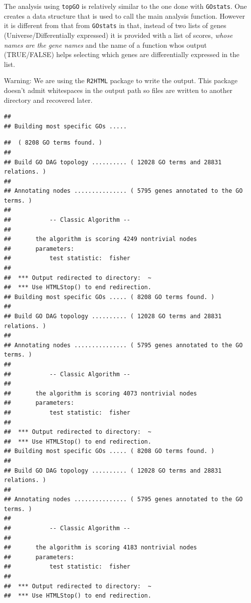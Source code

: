 \documentclass{article}\usepackage[]{graphicx}\usepackage[]{color}
\makeatletter
\newenvironment{kframe}{%
 \def\at@end@of@kframe{}%
 \ifinner\ifhmode%
  \def\at@end@of@kframe{\end{minipage}}%
  \begin{minipage}{\columnwidth}%
 \fi\fi%
 \def\FrameCommand##1{\hskip\@totalleftmargin \hskip-\fboxsep
 \colorbox{shadecolor}{##1}\hskip-\fboxsep
     \hskip-\linewidth \hskip-\@totalleftmargin \hskip\columnwidth}%
 \MakeFramed {\advance\hsize-\width
   \@totalleftmargin\z@ \linewidth\hsize
   \@setminipage}}%
 {\par\unskip\endMakeFramed%
 \at@end@of@kframe}
\newenvironment{knitrout}{}{} %
\makeatother
\begin{document}
The analysis using \texttt{topGO} is relatively similar to the one done with \texttt{GOstats}. One creates a data structure that is used to call the main analysis function. However it is different from that from \texttt{GOstats} in that, instead of two lists of genes (Universe/Differentially expressed) it is provided with a list of scores, \emph{whose names are the gene names} and the name of a function whos output (TRUE/FALSE) helps selecting which genes are differentially expressed in the list.

Warning: We are using the \texttt{R2HTML} package to write the output. This package doesn't admit whitespaces in the output path so files are written to another directory and recovered later.

\begin{knitrout}
\color{fgcolor}\begin{kframe}


{\ttfamily\noindent\itshape\color{messagecolor}{\#\# Loading required package: R2HTML}}\begin{verbatim}
## 
## Building most specific GOs .....
\end{verbatim}


{\ttfamily\noindent\itshape\color{messagecolor}{\#\# Loading required package: hgu133a.db}}

{\ttfamily\noindent\itshape\color{messagecolor}{\#\# }}\begin{verbatim}
## 	( 8208 GO terms found. )
## 
## Build GO DAG topology ..........	( 12028 GO terms and 28831 relations. )
## 
## Annotating nodes ...............	( 5795 genes annotated to the GO terms. )
## 
## 			 -- Classic Algorithm -- 
## 
## 		 the algorithm is scoring 4249 nontrivial nodes
## 		 parameters: 
## 			 test statistic:  fisher 
## 
##  *** Output redirected to directory:  ~
##  *** Use HTMLStop() to end redirection.
## Building most specific GOs .....	( 8208 GO terms found. )
## 
## Build GO DAG topology ..........	( 12028 GO terms and 28831 relations. )
## 
## Annotating nodes ...............	( 5795 genes annotated to the GO terms. )
## 
## 			 -- Classic Algorithm -- 
## 
## 		 the algorithm is scoring 4073 nontrivial nodes
## 		 parameters: 
## 			 test statistic:  fisher 
## 
##  *** Output redirected to directory:  ~
##  *** Use HTMLStop() to end redirection.
## Building most specific GOs .....	( 8208 GO terms found. )
## 
## Build GO DAG topology ..........	( 12028 GO terms and 28831 relations. )
## 
## Annotating nodes ...............	( 5795 genes annotated to the GO terms. )
## 
## 			 -- Classic Algorithm -- 
## 
## 		 the algorithm is scoring 4183 nontrivial nodes
## 		 parameters: 
## 			 test statistic:  fisher 
## 
##  *** Output redirected to directory:  ~
##  *** Use HTMLStop() to end redirection.
\end{verbatim}
\end{kframe}
\end{knitrout}
\end{document}
